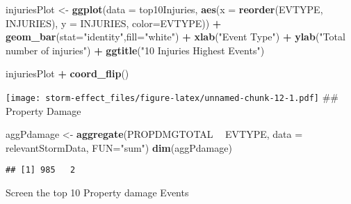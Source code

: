 \documentclass[
]{article}
\newenvironment{Shaded}{\begin{snugshade}}{\end{snugshade}}
\newcommand{\DataTypeTok}[1]{\textcolor[rgb]{0.13,0.29,0.53}{#1}}
\newcommand{\DecValTok}[1]{\textcolor[rgb]{0.00,0.00,0.81}{#1}}
\newcommand{\KeywordTok}[1]{\textcolor[rgb]{0.13,0.29,0.53}{\textbf{#1}}}
\newcommand{\NormalTok}[1]{#1}
\newcommand{\OperatorTok}[1]{\textcolor[rgb]{0.81,0.36,0.00}{\textbf{#1}}}
\newcommand{\StringTok}[1]{\textcolor[rgb]{0.31,0.60,0.02}{#1}}
\begin{document}
\begin{Shaded}
\begin{Highlighting}[]
\NormalTok{injuriesPlot <-}\StringTok{ }\KeywordTok{ggplot}\NormalTok{(}\DataTypeTok{data =}\NormalTok{ top10Injuries, }\KeywordTok{aes}\NormalTok{(}\DataTypeTok{x =} \KeywordTok{reorder}\NormalTok{(EVTYPE, INJURIES), }\DataTypeTok{y =}\NormalTok{ INJURIES, }\DataTypeTok{color=}\NormalTok{EVTYPE)) }\OperatorTok{+}\StringTok{ }\KeywordTok{geom_bar}\NormalTok{(}\DataTypeTok{stat=}\StringTok{"identity"}\NormalTok{,}\DataTypeTok{fill=}\StringTok{"white"}\NormalTok{) }\OperatorTok{+}\StringTok{ }\KeywordTok{xlab}\NormalTok{(}\StringTok{"Event Type"}\NormalTok{) }\OperatorTok{+}\StringTok{  }\KeywordTok{ylab}\NormalTok{(}\StringTok{"Total number of injuries"}\NormalTok{) }\OperatorTok{+}\StringTok{  }\KeywordTok{ggtitle}\NormalTok{(}\StringTok{"10 Injuries Highest Events"}\NormalTok{) }

\NormalTok{injuriesPlot }\OperatorTok{+}\StringTok{ }\KeywordTok{coord_flip}\NormalTok{()}
\end{Highlighting}
\end{Shaded}

\texttt{[image: storm-effect\_files/figure-latex/unnamed-chunk-12-1.pdf]}
\#\# Property Damage

\begin{Shaded}
\begin{Highlighting}[]
\NormalTok{aggPdamage <-}\StringTok{ }\KeywordTok{aggregate}\NormalTok{(PROPDMGTOTAL }\OperatorTok{~}\StringTok{ }\NormalTok{EVTYPE, }\DataTypeTok{data =}\NormalTok{ relevantStormData,  }\DataTypeTok{FUN=}\StringTok{"sum"}\NormalTok{)}
\KeywordTok{dim}\NormalTok{(aggPdamage) }
\end{Highlighting}
\end{Shaded}

\begin{verbatim}
## [1] 985   2
\end{verbatim}

Screen the top 10 Property damage Events

\begin{Shaded}
\end{Shaded}
\end{document}
